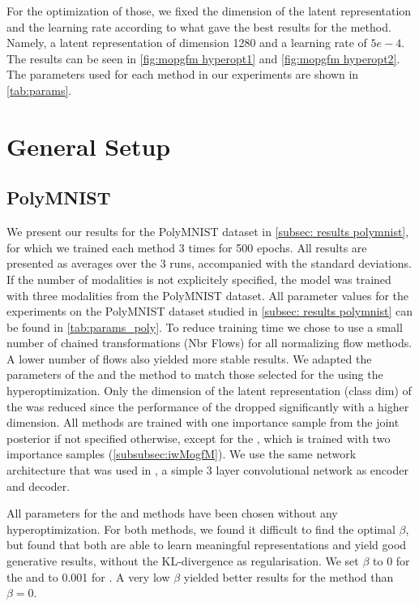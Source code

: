 For the optimization of those, we fixed the dimension of the latent representation and the learning rate according to what gave the best results for the  method.
Namely, a latent representation of dimension 1280 and a learning rate of $5e-4$.
The results can be seen in \cref{fig:mopgfm hyperopt1} and \cref{fig:mopgfm hyperopt2}.
The parameters used for each method in our experiments are shown in \cref{tab:params}.


\section{General Setup}

\subsection{PolyMNIST}
We present our results for the PolyMNIST dataset in \cref{subsec: results polymnist}, for which we trained each method 3 times for 500 epochs.
All results are presented as averages over the 3 runs, accompanied with the standard deviations.
If the number of modalities is not explicitely specified, the model was trained with three modalities from the PolyMNIST dataset.
All parameter values for the experiments on the PolyMNIST dataset studied in \cref{subsec: results polymnist} can be found in \cref{tab:params_poly}.
To reduce training time we chose to use a small number of chained transformations (Nbr Flows) for all normalizing flow methods.
A lower number of flows also yielded more stable results.
We adapted the parameters of the  and the  method to match those selected for the  using the hyperoptimization.
Only the dimension of the latent representation (class dim) of the  was reduced since the performance of the  dropped significantly with a higher dimension.
All methods are trained with one importance sample from the joint posterior if not specified otherwise, except for the , which is trained with two importance samples (\cref{subsubsec:iwMogfM}).
We use the same network architecture that was used in \citep{sutter_generalized_2020}, a simple 3 layer convolutional network as encoder and decoder.

All parameters for the  and  methods have been chosen without any hyperoptimization.
For both methods, we found it difficult to find the optimal $\beta$, but found that both are able to learn meaningful representations and yield good generative results, without the KL-divergence as regularisation.
We set $\beta$ to 0 for the  and to 0.001 for .
A very low $\beta$ yielded better results for the  method than $\beta = 0$.



